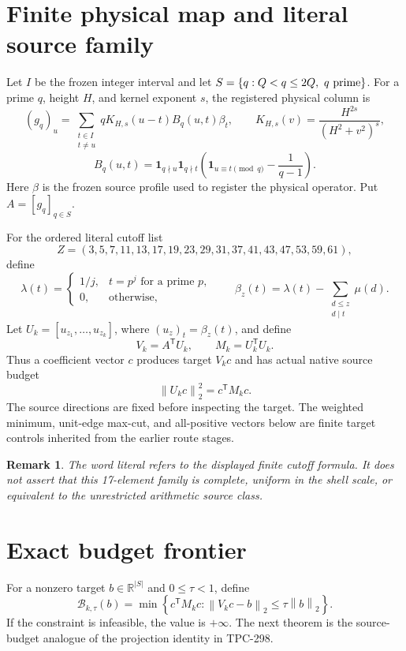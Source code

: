 \documentclass[10pt]{article}
\newtheorem{remark}{Remark}
\newcommand{\R}{\mathbb{R}}
\newcommand{\norm}[1]{\left\lVert #1\right\rVert}
\newcommand{\B}{\mathcal B}
\begin{document}
\section{Finite physical map and literal source family}

Let $I$ be the frozen integer interval and let
$S=\{q:Q<q\leq 2Q,\ q\ {\rm prime}\}$.  For a prime $q$, height $H$, and
kernel exponent $s$, the registered physical column is
\[
 (g_q)_u=\sum_{\substack{t\in I\\t\ne u}}
 qK_{H,s}(u-t)B_q(u,t)\beta_t,\qquad
 K_{H,s}(v)=\frac{H^{2s}}{(H^2+v^2)^s},
 \]
\[
 B_q(u,t)=\mathbf 1_{q\nmid u}\mathbf 1_{q\nmid t}
 \left(\mathbf 1_{u\equiv t\pmod q}-\frac1{q-1}\right).
 \]
Here $\beta$ is the frozen source profile used to register the physical
operator.  Put $A=[g_q]_{q\in S}$.

For the ordered literal cutoff list
\[
 Z=(3,5,7,11,13,17,19,23,29,31,37,41,43,47,53,59,61),
 \]
define
\[
 \lambda(t)=
 \begin{cases}1/j,&t=p^j \text{ for a prime }p,\\0,&\text{otherwise},
 \end{cases}
 \qquad
 \beta_z(t)=\lambda(t)-\sum_{\substack{d\leq z\\d\mid t}}\mu(d).
 \]
Let $U_k=[u_{z_1},\ldots,u_{z_k}]$, where
$(u_z)_t=\beta_z(t)$, and define
\[
 V_k=A^{\mathsf T}U_k,\qquad M_k=U_k^{\mathsf T}U_k.
 \]
Thus a coefficient vector $c$ produces target $V_kc$ and has actual
native source budget
\[
 \norm{U_kc}_2^2=c^{\mathsf T}M_kc.
 \]
The source directions are fixed before inspecting the target.  The weighted
minimum, unit-edge max-cut, and all-positive vectors below are finite target
controls inherited from the earlier route stages.

\begin{remark}
The word literal refers to the displayed finite cutoff formula.  It does
not assert that this 17-element family is complete, uniform in the shell
scale, or equivalent to the unrestricted arithmetic source class.
\end{remark}

\section{Exact budget frontier}

For a nonzero target $b\in\R^{|S|}$ and $0\leq\tau<1$, define
\[
 \B_{k,\tau}(b)=
 \min\left\{c^{\mathsf T}M_kc:
 \norm{V_kc-b}_2\leq\tau\norm{b}_2\right\}.
\label{eq:frontier}
 \]
If the constraint is infeasible, the value is $+\infty$.  The next theorem
is the source-budget analogue of the projection identity in TPC-298.
\end{document}
